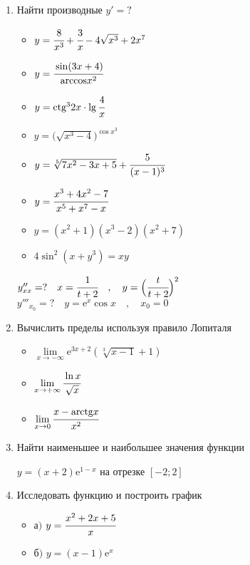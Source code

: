 \documentclass{article}
\begin{document}
\begin{multicols}{2}
\begin{enumerate}[label=\arabic*.]
		\item Найти производные $y'=?$
		\begin{multicols}{2}
			\begin{itemize}[label=""]
				\item $y=\cfrac{8}{x^3}+\cfrac{3}{x}-4\sqrt{x^3}+2x^7$
				\item $y=\cfrac{\sin (3x+4)}{\mbox{arccos}x^2}$
				\item $y=\mbox{ctg}^32x \cdot \lg\cfrac{4}{x}$
				\item $y=\Big(\sqrt{x^3 - 4}\Big)^{\cos x^3}$
			\end{itemize}
			\vfill\null\columnbreak
			\begin{itemize}[label=""]
				\item $y=\sqrt[5]{7x^2-3x+5} + \cfrac{5}{(x-1)^3}$
				\item $y=\cfrac{x^3+4x^2-7}{x^5+x^7-x}$
				\item $y=(x^2 + 1)(x^3 -2)(x^2 +7)$
				\item $4\sin^2(x+y^3)=xy$
			\end{itemize}
		\end{multicols}
		\vspace{-3mm}
		$y''_{xx}=? \quad x=\cfrac{1}{t+2} \quad,\quad y=\Big(\cfrac{t}{t+2}\Big)^2$ \\
		$y'''_{x_0}=? \quad y=\mbox{e}^x \cos x \quad,\quad x_0=0$
		\item Вычислить пределы используя правило Лопиталя
		\begin{multicols}{3}
			\raggedcolumns
			\begin{itemize}[label=""]
				\item $\lim\limits_{x\to-\infty} \mbox{e}^{3x+2}(\sqrt[3]{x - 1} + 1)$
				\vfill\null\columnbreak
				\item $\lim\limits_{x\to+\infty}\cfrac{\ln x}{\sqrt{x}}$
				\vfill\null\columnbreak
				\item $\lim\limits_{x\to 0}\cfrac{x-\mbox{arctg}x}{x^2}$
				\vfill\null\columnbreak
			\end{itemize}
		\end{multicols}
		\vspace{-4mm}	
		\item Найти наименьшее и наибольшее значения функции
		
		$y=(x+2)\mbox{e}^{1-x}$ на отрезке $[-2;2]$
		\item Исследовать функцию и построить график
		\begin{multicols}{2}
			\begin{itemize}[label=""]
				\setlength\itemsep{0.5em}
				\item а$)$ $y=\cfrac{x^2+2x+5}{x}$
			\end{itemize}
			\vfill\null\columnbreak
			\begin{itemize}[label=""]
				\setlength\itemsep{0.5em}
				\item б$)$ $y=(x-1)\mbox{e}^x$
			\end{itemize}
		\end{multicols}
	\end{enumerate}	
\end{multicols}
\end{document}
